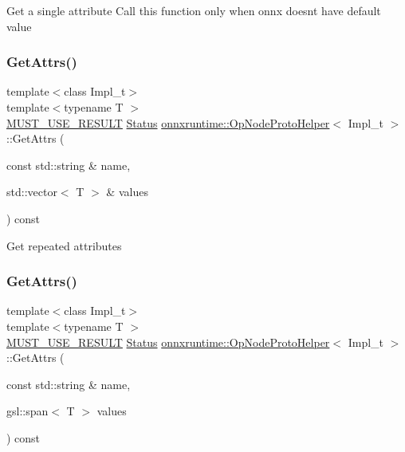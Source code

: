 Get a single attribute Call this function only when onnx doesn\textquotesingle{}t have default value \mbox{\label{classonnxruntime_1_1OpNodeProtoHelper_a9eb3e20eb1e04d901b67bbb32f027161}} 
\subsubsection{\texorpdfstring{Get\+Attrs()}{GetAttrs()}\hspace{0.1cm}{\footnotesize\ttfamily [1/2]}}
{\footnotesize\ttfamily template$<$class Impl\+\_\+t$>$ \\
template$<$typename T $>$ \\
\mbox{\hyperlink{op__node__proto__helper_8h_afefbce768b9d0df9c9ebc30dd6d13fed}{M\+U\+S\+T\+\_\+\+U\+S\+E\+\_\+\+R\+E\+S\+U\+LT}} \mbox{\hyperlink{classonnxruntime_1_1common_1_1Status}{Status}} \mbox{\hyperlink{classonnxruntime_1_1OpNodeProtoHelper}{onnxruntime\+::\+Op\+Node\+Proto\+Helper}}$<$ Impl\+\_\+t $>$\+::Get\+Attrs (\begin{DoxyParamCaption}\item[{const std\+::string \&}]{name,  }\item[{std\+::vector$<$ T $>$ \&}]{values }\end{DoxyParamCaption}) const}

Get repeated attributes \mbox{\label{classonnxruntime_1_1OpNodeProtoHelper_a8062b57424aadbfffcfe1095ce871765}} 
\subsubsection{\texorpdfstring{Get\+Attrs()}{GetAttrs()}\hspace{0.1cm}{\footnotesize\ttfamily [2/2]}}
{\footnotesize\ttfamily template$<$class Impl\+\_\+t$>$ \\
template$<$typename T $>$ \\
\mbox{\hyperlink{op__node__proto__helper_8h_afefbce768b9d0df9c9ebc30dd6d13fed}{M\+U\+S\+T\+\_\+\+U\+S\+E\+\_\+\+R\+E\+S\+U\+LT}} \mbox{\hyperlink{classonnxruntime_1_1common_1_1Status}{Status}} \mbox{\hyperlink{classonnxruntime_1_1OpNodeProtoHelper}{onnxruntime\+::\+Op\+Node\+Proto\+Helper}}$<$ Impl\+\_\+t $>$\+::Get\+Attrs (\begin{DoxyParamCaption}\item[{const std\+::string \&}]{name,  }\item[{gsl\+::span$<$ T $>$}]{values }\end{DoxyParamCaption}) const}

